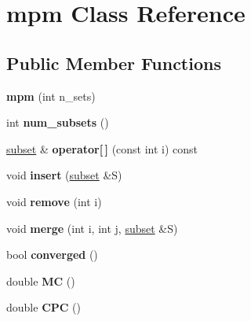 \hypertarget{classmpm}{\section{mpm \-Class \-Reference}
\label{classmpm}
}
\subsection*{\-Public \-Member \-Functions}
\begin{DoxyCompactItemize}
\item 
\hypertarget{classmpm_a236b588aae9ca04376b5103c797c64ff}{{\bfseries mpm} (int n\-\_\-sets)}\label{classmpm_a236b588aae9ca04376b5103c797c64ff}

\item 
\hypertarget{classmpm_a795d0e79afb3e9c41c1911719a1e35e1}{int {\bfseries num\-\_\-subsets} ()}\label{classmpm_a795d0e79afb3e9c41c1911719a1e35e1}

\item 
\hypertarget{classmpm_a40ca9ca5fb3fd36df6bfa33f4fafbea3}{\hyperlink{classsubset}{subset} \& {\bfseries operator\mbox{[}$\,$\mbox{]}} (const int i) const }\label{classmpm_a40ca9ca5fb3fd36df6bfa33f4fafbea3}

\item 
\hypertarget{classmpm_a55bc47e07e553da9b2114605fe102682}{void {\bfseries insert} (\hyperlink{classsubset}{subset} \&\-S)}\label{classmpm_a55bc47e07e553da9b2114605fe102682}

\item 
\hypertarget{classmpm_afd414d67d9f148eefca03d39273a7351}{void {\bfseries remove} (int i)}\label{classmpm_afd414d67d9f148eefca03d39273a7351}

\item 
\hypertarget{classmpm_a0af1926de1915f63750549c0837cee59}{void {\bfseries merge} (int i, int j, \hyperlink{classsubset}{subset} \&\-S)}\label{classmpm_a0af1926de1915f63750549c0837cee59}

\item 
\hypertarget{classmpm_a2cd27c4264ddcd8811d657d2577e8b89}{bool {\bfseries converged} ()}\label{classmpm_a2cd27c4264ddcd8811d657d2577e8b89}

\item 
\hypertarget{classmpm_aae172424b6af1a0c1c3c78b2d1c6b836}{double {\bfseries \-M\-C} ()}\label{classmpm_aae172424b6af1a0c1c3c78b2d1c6b836}

\item 
\hypertarget{classmpm_ac660c2459c135194fe1c5f05e00bdcc3}{double {\bfseries \-C\-P\-C} ()}\label{classmpm_ac660c2459c135194fe1c5f05e00bdcc3}


\end{DoxyCompactItemize}
